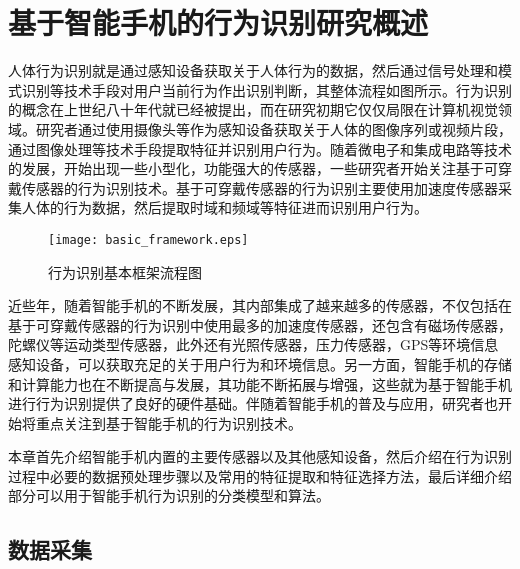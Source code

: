 \chapter{基于智能手机的行为识别研究概述}
\par 人体行为识别就是通过感知设备获取关于人体行为的数据，然后通过信号处理和模式识别等技术手段对用户当前行为作出识别判断，其整体流程如图所示。行为识别的概念在上世纪八十年代就已经被提出，而在研究初期它仅仅局限在计算机视觉领域。研究者通过使用摄像头等作为感知设备获取关于人体的图像序列或视频片段，通过图像处理等技术手段提取特征并识别用户行为。随着微电子和集成电路等技术的发展，开始出现一些小型化，功能强大的传感器，一些研究者开始关注基于可穿戴传感器的行为识别技术。基于可穿戴传感器的行为识别主要使用加速度传感器采集人体的行为数据，然后提取时域和频域等特征进而识别用户行为。

\begin{figure}[ht]
\centering
\texttt{[image: basic\_framework.eps]}
\caption{行为识别基本框架流程图}
\end{figure}

\par 近些年，随着智能手机的不断发展，其内部集成了越来越多的传感器，不仅包括在基于可穿戴传感器的行为识别中使用最多的加速度传感器，还包含有磁场传感器，陀螺仪等运动类型传感器，此外还有光照传感器，压力传感器，GPS等环境信息感知设备，可以获取充足的关于用户行为和环境信息。另一方面，智能手机的存储和计算能力也在不断提高与发展，其功能不断拓展与增强，这些就为基于智能手机进行行为识别提供了良好的硬件基础。伴随着智能手机的普及与应用，研究者也开始将重点关注到基于智能手机的行为识别技术。
\par 本章首先介绍智能手机内置的主要传感器以及其他感知设备，然后介绍在行为识别过程中必要的数据预处理步骤以及常用的特征提取和特征选择方法，最后详细介绍部分可以用于智能手机行为识别的分类模型和算法。

\section{数据采集}
